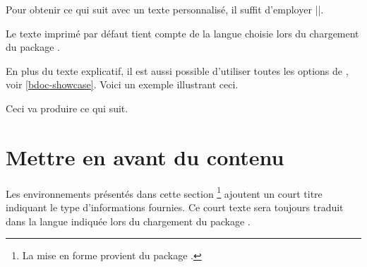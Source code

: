 \documentclass[12pt, a4paper]{article}
\begin{document}


\begin{bdocexa}
    Pour obtenir ce qui suit avec un texte personnalisé, il suffit d'employer \bdocinlatex||.

    \medskip

    \begin{bdoc-doc-showcase}
    \end{bdoc-doc-showcase}
\end{bdocexa}




\begin{bdocnote}
    Le texte imprimé par défaut tient compte de la langue choisie lors du chargement du package .
\end{bdocnote}




\begin{bdocexa}
    En plus du texte explicatif, il est aussi possible d'utiliser toutes les options de , voir \ref{bdoc-showcase}.
    Voici un exemple illustrant ceci.

    \medskip


    \medskip

    Ceci va produire ce qui suit.

    \medskip

    \begin{bdoc-doc-showcase}
        
    \end{bdoc-doc-showcase}
\end{bdocexa}


\section{Mettre en avant du contenu}

\begin{bdocnote}
    Les environnements présentés dans cette section
    \footnote{
        La mise en forme provient du package .
    }
    ajoutent un court titre indiquant le type d'informations fournies.
    Ce court texte sera toujours traduit dans la langue indiquée lors du chargement du package .
\end{bdocnote}
\end{document}

